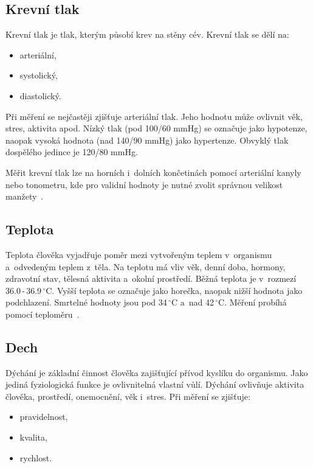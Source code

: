          \subsection{Krevní tlak} 
        Krevní tlak je tlak, kterým působí krev na stěny cév. Krevní tlak se dělí na: 
        \begin{itemize}
            \item arteriální,
            \item systolický,
            \item diastolický.
        \end{itemize}
            
        Při měření se nejčastěji zjišťuje arteriální tlak. Jeho hodnotu může ovlivnit věk, stres, aktivita apod. Nízký tlak (pod 100/60 mmHg) se označuje jako hypotenze, naopak vysoká hodnota (nad 140/90 mmHg) jako hypertenze. Obvyklý tlak dospělého jedince je 120/80 mmHg. 
        
        Měřit krevní tlak lze na horních i~dolních končetinách pomocí arteriální kanyly nebo tonometru, kde pro validní hodnoty je nutné zvolit správnou velikost manžety~\cite{wiki:fyzio_sledovani}. 
            
        \subsection{Teplota} 
        Teplota člověka vyjadřuje poměr mezi vytvořeným teplem v~organismu a~odvedeným teplem z~těla. Na teplotu má vliv věk, denní doba, hormony, zdravotní stav, tělesná aktivita a~okolní prostředí. Běžná teplota je v~rozmezí 36.0\,-\,36.9\,$^\circ$C. Vyšší teplota se označuje jako horečka, naopak nižší hodnota jako podchlazení. Smrtelné hodnoty jsou pod 34\,$^\circ$C a~nad 42\,$^\circ$C. Měření probíhá pomocí teploměru~\cite{wiki:fyzio_sledovani}.
            
        \subsection{Dech} 
        Dýchání je základní činnost člověka zajišťující přívod kyslíku do organismu. Jako jediná fyziologická funkce je ovlivnitelná vlastní vůlí. Dýchání ovlivňuje aktivita člověka, prostředí, onemocnění, věk i~stres. Při měření se zjišťuje:
        \begin{itemize}
            \item pravidelnost,
            \item kvalita,
            \item rychlost.
        \end{itemize}
        
